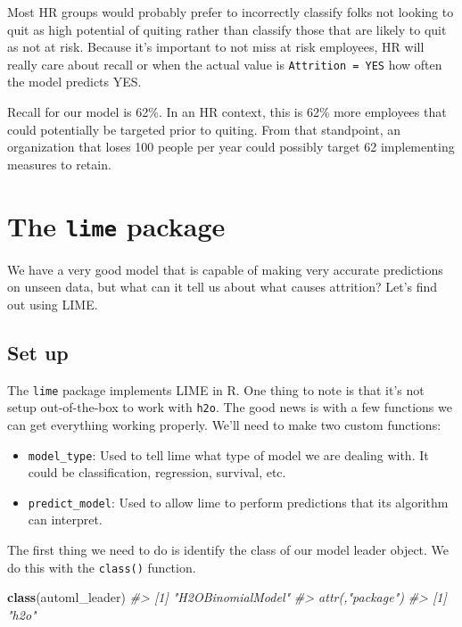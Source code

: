 \documentclass[]{book}
\newenvironment{Shaded}{\begin{snugshade}}{\end{snugshade}}
\newcommand{\CommentTok}[1]{\textcolor[rgb]{0.56,0.35,0.01}{\textit{#1}}}
\newcommand{\KeywordTok}[1]{\textcolor[rgb]{0.13,0.29,0.53}{\textbf{#1}}}
\newcommand{\NormalTok}[1]{#1}
\begin{document}
Most HR groups would probably prefer to incorrectly classify folks not looking to quit as high potential of quiting rather than classify those that are likely to quit as not at risk. Because it's important to not miss at risk employees, HR will really care about recall or when the actual value is \texttt{Attrition\ =\ YES} how often the model predicts YES.

Recall for our model is 62\%. In an HR context, this is 62\% more employees that could potentially be targeted prior to quiting. From that standpoint, an organization that loses 100 people per year could possibly target 62 implementing measures to retain.

\hypertarget{the-lime-package}{%
\section{\texorpdfstring{The \texttt{lime} package}{The lime package}}\label{the-lime-package}}

We have a very good model that is capable of making very accurate predictions on unseen data, but what can it tell us about what causes attrition? Let's find out using LIME.

\hypertarget{set-up}{%
\subsection{Set up}\label{set-up}}

The \texttt{lime} package implements LIME in R. One thing to note is that it's not setup out-of-the-box to work with \texttt{h2o}. The good news is with a few functions we can get everything working properly. We'll need to make two custom functions:

\begin{itemize}
\item
  \texttt{model\_type}: Used to tell lime what type of model we are dealing with. It could be classification, regression, survival, etc.
\item
  \texttt{predict\_model}: Used to allow lime to perform predictions that its algorithm can interpret.
\end{itemize}

The first thing we need to do is identify the class of our model leader object. We do this with the \texttt{class()} function.

\begin{Shaded}
\begin{Highlighting}[]
\KeywordTok{class}\NormalTok{(automl_leader)}
\CommentTok{#> [1] "H2OBinomialModel"}
\CommentTok{#> attr(,"package")}
\CommentTok{#> [1] "h2o"}
\end{Highlighting}
\end{Shaded}
\end{document}
